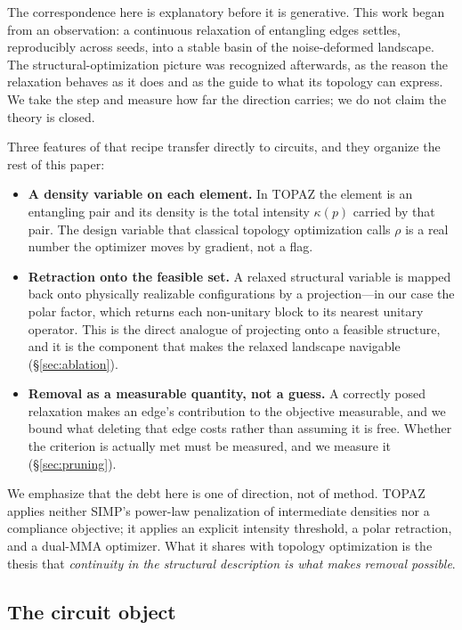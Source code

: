 \documentclass[twocolumn,aps,prl,superscriptaddress,showkeys]{revtex4-2}
\theoremstyle{plain}
\theoremstyle{definition}
\begin{document}
The correspondence here is explanatory before it is generative. This work began from an observation: a continuous relaxation of entangling edges settles, reproducibly across seeds, into a stable basin of the noise-deformed landscape. The structural-optimization picture was recognized afterwards, as the reason the relaxation behaves as it does and as the guide to what its topology can express. We take the step and measure how far the direction carries; we do not claim the theory is closed.

Three features of that recipe transfer directly to circuits, and they organize the rest of this paper:

\begin{itemize}
\item \textbf{A density variable on each element.} In TOPAZ the element is an entangling pair and its density is the total intensity $\kappa(p)$ carried by that pair. The design variable that classical topology optimization calls $\rho$ is a real number the optimizer moves by gradient, not a flag.
\item \textbf{Retraction onto the feasible set.} A relaxed structural variable is mapped back onto physically realizable configurations by a projection---in our case the polar factor, which returns each non-unitary block to its nearest unitary operator. This is the direct analogue of projecting onto a feasible structure, and it is the component that makes the relaxed landscape navigable (\S\ref{sec:ablation}).
\item \textbf{Removal as a measurable quantity, not a guess.} A correctly posed relaxation makes an edge's contribution to the objective measurable, and we bound what deleting that edge costs rather than assuming it is free. Whether the criterion is actually met must be measured, and we measure it (\S\ref{sec:pruning}).
\end{itemize}

We emphasize that the debt here is one of direction, not of method. TOPAZ applies neither SIMP's power-law penalization of intermediate densities nor a compliance objective; it applies an explicit intensity threshold, a polar retraction, and a dual-MMA optimizer. What it shares with topology optimization is the thesis that \emph{continuity in the structural description is what makes removal possible}.

\subsection{The circuit object}
\end{document}
